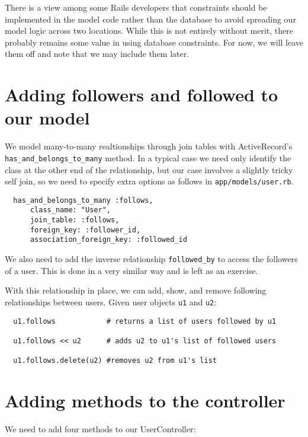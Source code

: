 \documentclass{article}
\begin{document}
There is a view among some Rails developers that constraints should be implemented in the model code rather than the database to avoid spreading our model logic across two locations.  While this is not entirely without merit, there probably remains some value in using database constraints.  For now, we will leave them off and note that we may include them later.

\section{Adding followers and followed to our model}
We model many-to-many realtionships through join tables with ActiveRecord's \texttt{has\_and\_belongs\_to\_many} method.  In a typical case we need only identify the class at the other end of the relationship, but our case involves a slightly tricky self join, so we need to specify extra options as follows in \texttt{app/models/user.rb}.

\begin{verbatim}
  has_and_belongs_to_many :follows,
      class_name: "User",
      join_table: :follows,
      foreign_key: :follower_id,
      association_foreign_key: :followed_id
\end{verbatim}

We also need to add the inverse relationship \texttt{followed\_by} to access the followers of a user.  This is done in a very similar way and is left as an exercise.

With this relationship in place, we can add, show, and remove following relationships between users. Given user objects \texttt{u1} and \texttt{u2}:

\begin{verbatim}
  u1.follows            # returns a list of users followed by u1

  u1.follows << u2      # adds u2 to u1's list of followed users

  u1.follows.delete(u2) #removes u2 from u1's list
\end{verbatim}

\section{Adding methods to the controller}

We need to add four methods to our UserController:
\end{document}
